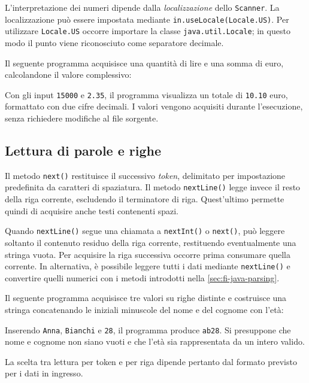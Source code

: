 L'interpretazione dei numeri dipende dalla
\emph{localizzazione} dello \texttt{Scanner}.
La localizzazione può essere impostata mediante
\texttt{in.useLocale(Locale.US)}. Per utilizzare
\texttt{Locale.US} occorre importare la classe
\texttt{java.util.Locale}; in questo modo il punto
viene riconosciuto come separatore decimale.

Il seguente programma acquisisce una quantità di lire
e una somma di euro, calcolandone il valore complessivo:



Con gli input \texttt{15000} e \texttt{2.35},
il programma visualizza un totale di \texttt{10.10}
euro, formattato con due cifre decimali.
I valori vengono acquisiti durante l'esecuzione,
senza richiedere modifiche al file sorgente.

\subsection{Lettura di parole e righe}
\label{sec:fi-java-scanner-testo}

Il metodo \texttt{next()} restituisce il successivo
\emph{token}, delimitato per impostazione predefinita
da caratteri di spaziatura. Il metodo
\texttt{nextLine()} legge invece il resto della
riga corrente, escludendo il terminatore di riga.
Quest'ultimo permette quindi di acquisire anche
testi contenenti spazi.

Quando \texttt{nextLine()} segue una chiamata a
\texttt{nextInt()} o \texttt{next()}, può leggere
soltanto il contenuto residuo della riga corrente,
restituendo eventualmente una stringa vuota.
Per acquisire la riga successiva occorre prima
consumare quella corrente. In alternativa, è
possibile leggere tutti i dati mediante
\texttt{nextLine()} e convertire quelli numerici
con i metodi introdotti nella
\cref{sec:fi-java-parsing}.

\begin{example}
Il seguente programma acquisisce tre valori su
righe distinte e costruisce una stringa concatenando
le iniziali minuscole del nome e del cognome con
l'età:



Inserendo \texttt{Anna}, \texttt{Bianchi} e
\texttt{28}, il programma produce \texttt{ab28}.
Si presuppone che nome e cognome non siano vuoti
e che l'età sia rappresentata da un intero valido.
\end{example}

La scelta tra lettura per token e per riga
dipende pertanto dal formato previsto per
i dati in ingresso.
